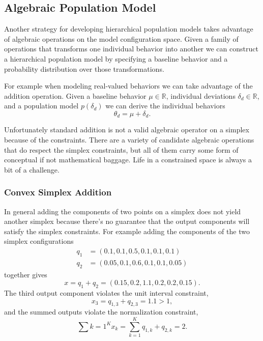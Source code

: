 \documentclass[
  letterpaper,
  DIV=11,
  numbers=noendperiod]{scrartcl}
\begin{document}
\subsection{Algebraic Population Model}\label{sec:algebraicpop}

Another strategy for developing hierarchical population models takes
advantage of algebraic operations on the model configuration space.
Given a family of operations that transforms one individual behavior
into another we can construct a hierarchical population model by
specifying a baseline behavior and a probability distribution over those
transformations.

For example when modeling real-valued behaviors we can take advantage of
the addition operation. Given a baseline behavior
\(\mu \in \mathbb{R}\), individual deviations
\(\delta_{d} \in \mathbb{R}\), and a population model \(p(\delta_{d})\)
we can derive the individual behaviors \[
\theta_{d} = \mu + \delta_{d}.
\]

Unfortunately standard addition is not a valid algebraic operator on a
simplex because of the constraints. There are a variety of candidate
algebraic operations that do respect the simplex constraints, but all of
them carry some form of conceptual if not mathematical baggage. Life in
a constrained space is always a bit of a challenge.

\subsubsection{Convex Simplex Addition}\label{convex-simplex-addition}

In general adding the components of two points on a simplex does not
yield another simplex because there's no guarantee that the output
components will satisfy the simplex constraints. For example adding the
components of the two simplex configurations \begin{align*}
q_{1} &= (0.1, 0.1, 0.5, 0.1, 0.1, 0.1)
\\
q_{2} &= (0.05, 0.1, 0.6, 0.1, 0.1, 0.05)
\end{align*} together gives \[
x = q_{1} + q_{2} = (0.15, 0.2, 1.1, 0.2, 0.2, 0.15).
\] The third output component violates the unit interval constraint, \[
x_{3} = q_{1, 3} + q_{2, 3} = 1.1 > 1,
\] and the summed outputs violate the normalization constraint, \[
\sum{k = 1}^{K} x_{k} = \sum_{k = 1}^{K} q_{1, k} + q_{2, k} = 2.
\]
\end{document}
